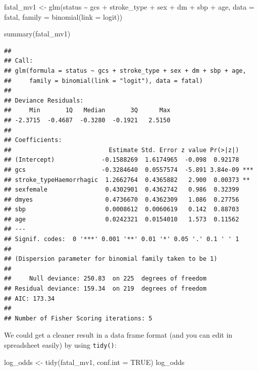 \documentclass[
  10pt,
]{krantz}
\newenvironment{Shaded}{\begin{snugshade}}{\end{snugshade}}
\newcommand{\AttributeTok}[1]{\textcolor[rgb]{0.77,0.63,0.00}{#1}}
\newcommand{\ConstantTok}[1]{\textcolor[rgb]{0.00,0.00,0.00}{#1}}
\newcommand{\FunctionTok}[1]{\textcolor[rgb]{0.00,0.00,0.00}{#1}}
\newcommand{\NormalTok}[1]{#1}
\newcommand{\OtherTok}[1]{\textcolor[rgb]{0.56,0.35,0.01}{#1}}
\newcommand{\SpecialCharTok}[1]{\textcolor[rgb]{0.00,0.00,0.00}{#1}}
\newcommand{\StringTok}[1]{\textcolor[rgb]{0.31,0.60,0.02}{#1}}
\begin{document}
\begin{Shaded}
\begin{Highlighting}[]
\NormalTok{fatal\_mv1 }\OtherTok{\textless{}{-}} 
  \FunctionTok{glm}\NormalTok{(status }\SpecialCharTok{\textasciitilde{}}\NormalTok{ gcs }\SpecialCharTok{+}\NormalTok{ stroke\_type }\SpecialCharTok{+}\NormalTok{ sex }\SpecialCharTok{+}\NormalTok{ dm }\SpecialCharTok{+}\NormalTok{ sbp }\SpecialCharTok{+}\NormalTok{ age, }
      \AttributeTok{data =}\NormalTok{ fatal, }
      \AttributeTok{family =} \FunctionTok{binomial}\NormalTok{(}\AttributeTok{link =} \StringTok{\textquotesingle{}logit\textquotesingle{}}\NormalTok{))}

\FunctionTok{summary}\NormalTok{(fatal\_mv1)}
\end{Highlighting}
\end{Shaded}

\begin{verbatim}
## 
## Call:
## glm(formula = status ~ gcs + stroke_type + sex + dm + sbp + age, 
##     family = binomial(link = "logit"), data = fatal)
## 
## Deviance Residuals: 
##     Min       1Q   Median       3Q      Max  
## -2.3715  -0.4687  -0.3280  -0.1921   2.5150  
## 
## Coefficients:
##                           Estimate Std. Error z value Pr(>|z|)    
## (Intercept)             -0.1588269  1.6174965  -0.098  0.92178    
## gcs                     -0.3284640  0.0557574  -5.891 3.84e-09 ***
## stroke_typeHaemorrhagic  1.2662764  0.4365882   2.900  0.00373 ** 
## sexfemale                0.4302901  0.4362742   0.986  0.32399    
## dmyes                    0.4736670  0.4362309   1.086  0.27756    
## sbp                      0.0008612  0.0060619   0.142  0.88703    
## age                      0.0242321  0.0154010   1.573  0.11562    
## ---
## Signif. codes:  0 '***' 0.001 '**' 0.01 '*' 0.05 '.' 0.1 ' ' 1
## 
## (Dispersion parameter for binomial family taken to be 1)
## 
##     Null deviance: 250.83  on 225  degrees of freedom
## Residual deviance: 159.34  on 219  degrees of freedom
## AIC: 173.34
## 
## Number of Fisher Scoring iterations: 5
\end{verbatim}

We could get a cleaner result in a data frame format (and you can edit in spreadsheet easily) by using \texttt{tidy()}:

\begin{Shaded}
\begin{Highlighting}[]
\NormalTok{log\_odds }\OtherTok{\textless{}{-}} \FunctionTok{tidy}\NormalTok{(fatal\_mv1, }
                 \AttributeTok{conf.int =} \ConstantTok{TRUE}\NormalTok{)}
\NormalTok{log\_odds}
\end{Highlighting}
\end{Shaded}
\end{document}
